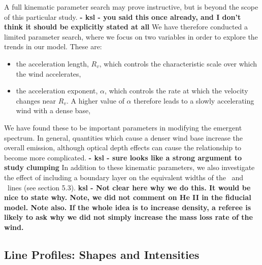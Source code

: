 \documentclass[preprint, a4paper, 11pt]{aastex}
\begin{document}
{A full kinematic parameter search may prove instructive, but
is beyond the scope of this particular study. {\bf - ksl - you said this once already, and I don't think it should be explicitly stated at all}
We have therefore conducted a limited parameter 
search, where we focus on 
two variables in order to explore the trends in our model. 
These are:

\begin{itemize}
 	\item the acceleration length, $R_v$, which controls the characteristic scale
 	over which the wind accelerates,
 	\item the acceleration exponent, $\alpha$, which controls the rate 
 	at which the velocity changes near $R_v$. 
 	A higher value of $\alpha$ therefore leads to a slowly accelerating 
 	wind with a dense base,
 \end{itemize} 

We have found these to be important parameters in modifying 
the emergent spectrum.
In general, quantities which cause a denser wind base increase
the overall emission, although optical depth effects can cause 
the relationship to become more complicated. {\bf - ksl - sure looks like a strong argument to study clumping} In addition to these 
kinematic parameters, we also investigate the effect of 
including a boundary layer on the equivalent widths of the 
\civfull\ and \heiiuv\ lines (see section 5.3).  {\bf ksl - Not clear here why we do this.  It would be nice to state why.  Note, we did not comment on He II in the fiducial model.  Note also.  If the whole idea is to increase density, a referee is likely to ask why we did not simply increase the mass loss rate of the wind.}



\subsection{Line Profiles: Shapes and Intensities}



}
\end{document}
